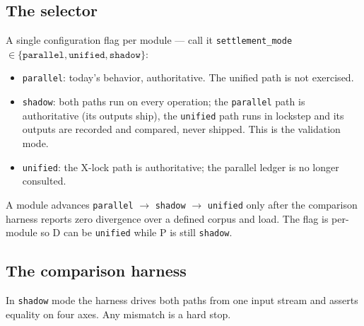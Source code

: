 \subsection{The selector}

A single configuration flag per module --- call it
\texttt{settlement\_mode} $\in \{\texttt{parallel},\texttt{unified},
\texttt{shadow}\}$:

\begin{itemize}[leftmargin=2em,nosep]
\item \texttt{parallel}: today's behavior, authoritative. The unified
  path is not exercised.
\item \texttt{shadow}: both paths run on every operation; the
  \texttt{parallel} path is authoritative (its outputs ship), the
  \texttt{unified} path runs in lockstep and its outputs are recorded
  and compared, never shipped. This is the validation mode.
\item \texttt{unified}: the X-lock path is authoritative; the parallel
  ledger is no longer consulted.
\end{itemize}

\noindent A module advances \texttt{parallel} $\to$ \texttt{shadow}
$\to$ \texttt{unified} only after the comparison harness reports zero
divergence over a defined corpus and load. The flag is per-module so D
can be \texttt{unified} while P is still \texttt{shadow}.

\subsection{The comparison harness}

In \texttt{shadow} mode the harness drives both paths from one input
stream and asserts equality on four axes. Any mismatch is a hard stop.

